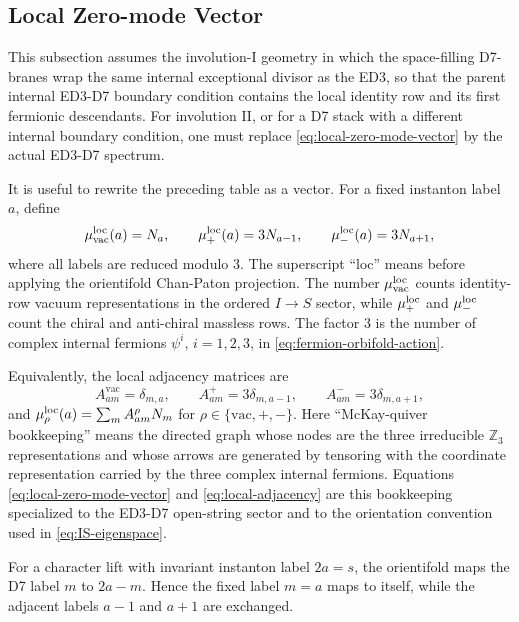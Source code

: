 \documentclass[11pt]{article}
\newcommand{\Z}{\mathbb{Z}}
\newcommand{\vac}{\mathrm{vac}}
\begin{document}
\subsection{Local Zero-mode Vector}

This subsection assumes the involution-I geometry in which the space-filling D7-branes wrap the
same internal exceptional divisor as the ED3, so that the parent internal ED3-D7 boundary
condition contains the local identity row and its first fermionic descendants. For involution II,
or for a D7 stack with a different internal boundary condition, one must replace
\eqref{eq:local-zero-mode-vector} by the actual ED3-D7 spectrum.

It is useful to rewrite the preceding table as a vector. For a fixed instanton label $a$, define
\begin{equation}
  \mu_{\vac}^{\rm loc}(a)=N_a,
  \qquad
  \mu_{+}^{\rm loc}(a)=3N_{a-1},
  \qquad
  \mu_{-}^{\rm loc}(a)=3N_{a+1},
  \label{eq:local-zero-mode-vector}
\end{equation}
where all labels are reduced modulo $3$. The superscript ``loc'' means before applying the
orientifold Chan-Paton projection. The number $\mu_{\vac}^{\rm loc}$ counts identity-row
vacuum representations in the ordered $I\to S$ sector, while $\mu_{+}^{\rm loc}$ and
$\mu_{-}^{\rm loc}$ count the chiral and anti-chiral massless rows. The factor $3$ is the number
of complex internal fermions $\psi^i$, $i=1,2,3$, in \eqref{eq:fermion-orbifold-action}.

Equivalently, the local adjacency matrices are
\begin{equation}
  A^{\vac}_{a m}=\delta_{m,a},
  \qquad
  A^{+}_{a m}=3\delta_{m,a-1},
  \qquad
  A^{-}_{a m}=3\delta_{m,a+1},
  \label{eq:local-adjacency}
\end{equation}
and \(\mu_{\rho}^{\rm loc}(a)=\sum_m A^\rho_{a m}N_m\) for
\(\rho\in\{\vac,+,-\}\). Here ``McKay-quiver bookkeeping'' means the directed graph whose nodes
are the three irreducible $\Z_3$ representations and whose arrows are generated by tensoring
with the coordinate representation carried by the three complex internal fermions. Equations
\eqref{eq:local-zero-mode-vector} and \eqref{eq:local-adjacency} are this bookkeeping
specialized to the ED3-D7 open-string sector and to the orientation convention used in
\eqref{eq:IS-eigenspace}.

For a character lift with invariant instanton label $2a=s$, the orientifold maps the D7 label
$m$ to $2a-m$. Hence the fixed label $m=a$ maps to itself, while the adjacent labels
$a-1$ and $a+1$ are exchanged.
\end{document}
